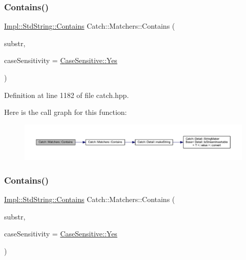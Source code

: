 \subsubsection{\texorpdfstring{Contains()}{Contains()}\hspace{0.1cm}{\footnotesize\ttfamily [1/2]}}
{\footnotesize\ttfamily \hyperlink{struct_catch_1_1_matchers_1_1_impl_1_1_std_string_1_1_contains}{Impl\+::\+Std\+String\+::\+Contains} Catch\+::\+Matchers\+::\+Contains (\begin{DoxyParamCaption}\item[{std\+::string const \&}]{substr,  }\item[{\hyperlink{struct_catch_1_1_case_sensitive_aad49d3aee2d97066642fffa919685c6a}{Case\+Sensitive\+::\+Choice}}]{case\+Sensitivity = {\ttfamily \hyperlink{struct_catch_1_1_case_sensitive_aad49d3aee2d97066642fffa919685c6aa7c5550b69ec3c502e6f609b67f9613c6}{Case\+Sensitive\+::\+Yes}} }\end{DoxyParamCaption})\hspace{0.3cm}{\ttfamily [inline]}}



Definition at line 1182 of file catch.\+hpp.

Here is the call graph for this function\+:\nopagebreak
\begin{figure}[H]
\begin{center}
\leavevmode
\includegraphics[width=350pt]{namespace_catch_1_1_matchers_a07760045eca8bafb7f6618fae10f1b59_cgraph}
\end{center}
\end{figure}
\hypertarget{namespace_catch_1_1_matchers_a7bc27b5c696118cbe54690d6c524b3d9}{}\label{namespace_catch_1_1_matchers_a7bc27b5c696118cbe54690d6c524b3d9} 
\subsubsection{\texorpdfstring{Contains()}{Contains()}\hspace{0.1cm}{\footnotesize\ttfamily [2/2]}}
{\footnotesize\ttfamily \hyperlink{struct_catch_1_1_matchers_1_1_impl_1_1_std_string_1_1_contains}{Impl\+::\+Std\+String\+::\+Contains} Catch\+::\+Matchers\+::\+Contains (\begin{DoxyParamCaption}\item[{const char $\ast$}]{substr,  }\item[{\hyperlink{struct_catch_1_1_case_sensitive_aad49d3aee2d97066642fffa919685c6a}{Case\+Sensitive\+::\+Choice}}]{case\+Sensitivity = {\ttfamily \hyperlink{struct_catch_1_1_case_sensitive_aad49d3aee2d97066642fffa919685c6aa7c5550b69ec3c502e6f609b67f9613c6}{Case\+Sensitive\+::\+Yes}} }\end{DoxyParamCaption})\hspace{0.3cm}{\ttfamily [inline]}}



